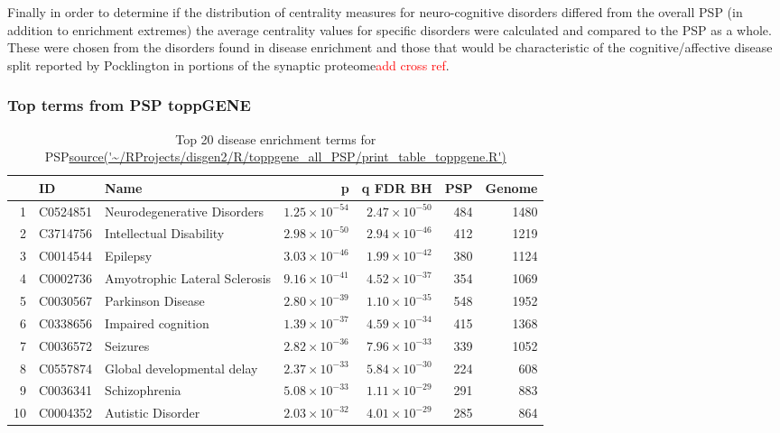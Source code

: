 Finally in order to determine if the distribution of centrality measures for neuro-cognitive disorders differed from the overall PSP (in addition to enrichment extremes) the average centrality values for specific disorders were calculated and compared to the PSP as a whole. These were chosen from the disorders found in disease enrichment and those that would be characteristic of the cognitive/affective disease split reported by Pocklington in portions of the synaptic proteome\cite{pocklington2006organization}\textcolor{red}{add cross ref}. 


\subsubsection{Top terms from PSP toppGENE}
\begin{table}[ht]
\centering
\begin{tabular}{rllrrrr}
  \hline
 & ID & Name & p & q FDR BH & PSP & Genome \\ 
  \hline
1 & C0524851 & Neurodegenerative Disorders & $1.25 \times 10^{-54}$ & $2.47 \times 10^{-50}$ & 484 & 1480 \\ 
  2 & C3714756 & Intellectual Disability & $2.98 \times 10^{-50}$ & $2.94 \times 10^{-46}$ & 412 & 1219 \\ 
  3 & C0014544 & Epilepsy & $3.03 \times 10^{-46}$ & $1.99 \times 10^{-42}$ & 380 & 1124 \\ 
  4 & C0002736 & Amyotrophic Lateral Sclerosis & $9.16 \times 10^{-41}$ & $4.52 \times 10^{-37}$ & 354 & 1069 \\ 
  5 & C0030567 & Parkinson Disease & $2.80 \times 10^{-39}$ & $1.10 \times 10^{-35}$ & 548 & 1952 \\ 
  6 & C0338656 & Impaired cognition & $1.39 \times 10^{-37}$ & $4.59 \times 10^{-34}$ & 415 & 1368 \\ 
  7 & C0036572 & Seizures & $2.82 \times 10^{-36}$ & $7.96 \times 10^{-33}$ & 339 & 1052 \\ 
  8 & C0557874 & Global developmental delay & $2.37 \times 10^{-33}$ & $5.84 \times 10^{-30}$ & 224 & 608 \\ 
  9 & C0036341 & Schizophrenia & $5.08 \times 10^{-33}$ & $1.11 \times 10^{-29}$ & 291 & 883 \\ 
  10 & C0004352 & Autistic Disorder & $2.03 \times 10^{-32}$ & $4.01 \times 10^{-29}$ & 285 & 864 \\ 
   \hline
\end{tabular}
\caption[Top twenty diseases enriched in post synaptic proteome (PSP)]{Top 20 disease enrichment terms for PSP\url{source('~/RProjects/disgen2/R/toppgene_all_PSP/print_table_toppgene.R')}} 
\end{table}

